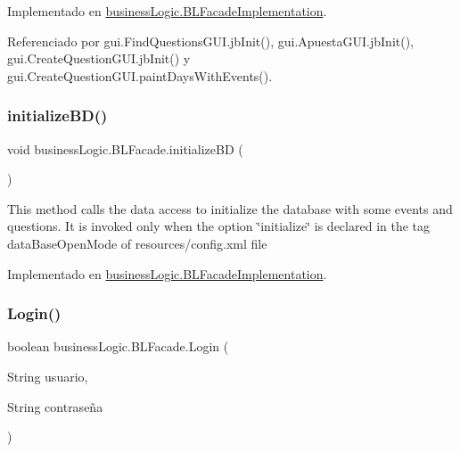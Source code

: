 Implementado en \mbox{\hyperlink{classbusinessLogic_1_1BLFacadeImplementation_a62cba365fc047beb4523773ef8a53644}{business\+Logic.\+B\+L\+Facade\+Implementation}}.



Referenciado por gui.\+Find\+Questions\+G\+U\+I.\+jb\+Init(), gui.\+Apuesta\+G\+U\+I.\+jb\+Init(), gui.\+Create\+Question\+G\+U\+I.\+jb\+Init() y gui.\+Create\+Question\+G\+U\+I.\+paint\+Days\+With\+Events().

\mbox{\label{interfacebusinessLogic_1_1BLFacade_a8c041928b06257ae83a56fa86e8c282b}} 
\subsubsection{\texorpdfstring{initializeBD()}{initializeBD()}}
{\footnotesize\ttfamily void business\+Logic.\+B\+L\+Facade.\+initialize\+BD (\begin{DoxyParamCaption}{ }\end{DoxyParamCaption})}

This method calls the data access to initialize the database with some events and questions. It is invoked only when the option \char`\"{}initialize\char`\"{} is declared in the tag data\+Base\+Open\+Mode of resources/config.\+xml file 

Implementado en \mbox{\hyperlink{classbusinessLogic_1_1BLFacadeImplementation_a5f915c64121f2a6e37af4fc337e88ff0}{business\+Logic.\+B\+L\+Facade\+Implementation}}.

\mbox{\label{interfacebusinessLogic_1_1BLFacade_adef077ad68e73cc18466c7f8805f1516}} 
\subsubsection{\texorpdfstring{Login()}{Login()}}
{\footnotesize\ttfamily boolean business\+Logic.\+B\+L\+Facade.\+Login (\begin{DoxyParamCaption}\item[{String}]{usuario,  }\item[{String}]{contraseña }\end{DoxyParamCaption})}



